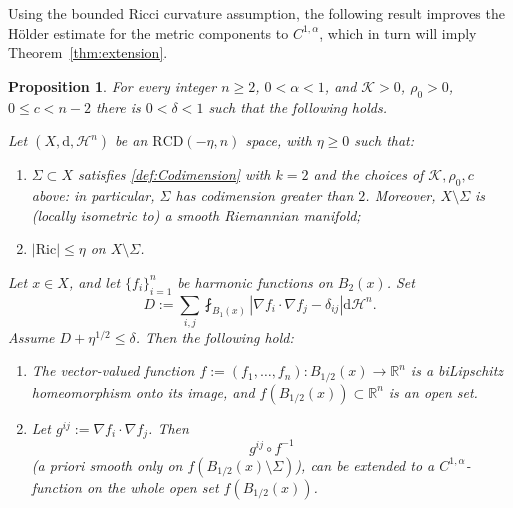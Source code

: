 \documentclass[12pt,a4paper,reqno]{amsart}
\newtheorem{prop}[theorem]{Proposition}
\renewcommand{\leq}{\leqslant}
\renewcommand{\geq}{\geqslant}
\begin{document}
Using the bounded Ricci curvature assumption, the following result improves the H\"older estimate for the metric components to $C^{1,\alpha}$, which in turn will imply Theorem~\ref{thm:extension}. 
\begin{prop}\label{propCinfty}
    For every integer $n\geq 2$, $0<\alpha<1$,  and $\mathcal{K}>0$, $\rho_0>0$, $0\leq c<n-2$ there is $0<\delta<1$ such that the following holds. 

    Let $(X,\mathrm{d},\mathcal{H}^n)$ be an $\mathrm{RCD}(-\eta,n)$ space, with $\eta\geq 0$ such that:
    \begin{enumerate}
        \item $\Sigma \subset X$ satisfies \cref{def:Codimension} with $k=2$ and the choices of $\mathcal{K},\rho_0,c$ above: in particular, $\Sigma$ has codimension greater than $2$. Moreover, $X\setminus\Sigma$ is (locally isometric to) a smooth Riemannian manifold;
        \item $|\mathrm{Ric}| \leq \eta$ on $X\setminus \Sigma$.
    \end{enumerate}
    Let $x\in X$, and let $\{f_i\}_{i=1}^n$ be harmonic functions on $B_2(x)$. Set  
    \[ 
    D:=\sum_{i,j} \fint_{B_1(x)} |\nabla f_i \cdot \nabla f_j - \delta_{ij}|\mathrm{d}\mathcal{H}^n.
    \]
    Assume $D+\eta^{1/2}\leq \delta$. Then the following hold:
    \begin{enumerate}
        \item The vector-valued function $f:=(f_1,\ldots,f_n):B_{1/2}(x)\to \mathbb R^n$ is a biLipschitz homeomorphism onto its image, and $f(B_{1/2}(x))\subset\mathbb R^n$ is an open set.
        \item Let $g^{ij}:=\nabla f_i\cdot\nabla f_j$. Then
        \[
    g^{ij}\circ f^{-1}
    \]
    (a priori smooth only on $f(B_{1/2}(x)\setminus\Sigma)$), can be extended to a $C^{1,\alpha}$-function on the whole open set $f(B_{1/2}(x))$.
    \end{enumerate}
\end{prop}
\end{document}
